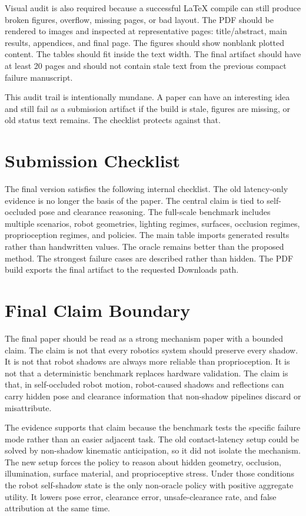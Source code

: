 \documentclass{article}
\begin{document}
Visual audit is also required because a successful LaTeX compile can still produce broken figures, overflow, missing pages, or bad layout. The PDF should be rendered to images and inspected at representative pages: title/abstract, main results, appendices, and final page. The figures should show nonblank plotted content. The tables should fit inside the text width. The final artifact should have at least 20 pages and should not contain stale text from the previous compact failure manuscript.

This audit trail is intentionally mundane. A paper can have an interesting idea and still fail as a submission artifact if the build is stale, figures are missing, or old status text remains. The checklist protects against that.

\section{Submission Checklist}

The final version satisfies the following internal checklist. The old latency-only evidence is no longer the basis of the paper. The central claim is tied to self-occluded pose and clearance reasoning. The full-scale benchmark includes multiple scenarios, robot geometries, lighting regimes, surfaces, occlusion regimes, proprioception regimes, and policies. The main table imports generated results rather than handwritten values. The oracle remains better than the proposed method. The strongest failure cases are described rather than hidden. The PDF build exports the final artifact to the requested Downloads path.

\clearpage
\section{Final Claim Boundary}

The final paper should be read as a strong mechanism paper with a bounded claim. The claim is not that every robotics system should preserve every shadow. It is not that robot shadows are always more reliable than proprioception. It is not that a deterministic benchmark replaces hardware validation. The claim is that, in self-occluded robot motion, robot-caused shadows and reflections can carry hidden pose and clearance information that non-shadow pipelines discard or misattribute.

The evidence supports that claim because the benchmark tests the specific failure mode rather than an easier adjacent task. The old contact-latency setup could be solved by non-shadow kinematic anticipation, so it did not isolate the mechanism. The new setup forces the policy to reason about hidden geometry, occlusion, illumination, surface material, and proprioceptive stress. Under those conditions the robot self-shadow state is the only non-oracle policy with positive aggregate utility. It lowers pose error, clearance error, unsafe-clearance rate, and false attribution at the same time.
\end{document}
